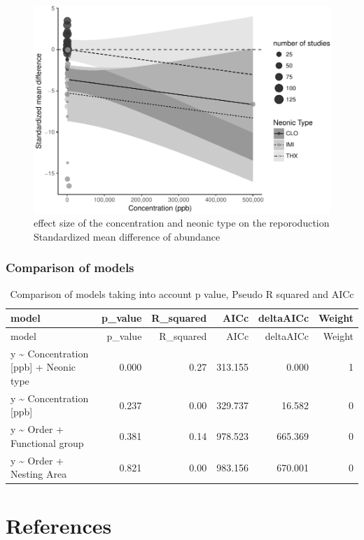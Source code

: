 \documentclass[]{elsarticle} %
\makeatletter
\def\maxwidth{\ifdim\Gin@nat@width>\linewidth\linewidth
\else\Gin@nat@width\fi}
\let\Oldincludegraphics\includegraphics
\renewcommand{\includegraphics}[1]{\Oldincludegraphics[width=\maxwidth]{#1}}
\makeatother
\begin{document}
\begin{figure}[htbp]
\centering
\includegraphics{MetanalysisNeonics2_files/figure-latex/unnamed-chunk-30-1.pdf}
\caption{effect size of the concentration and neonic type on the
reporoduction Standardized mean difference of abundance}
\end{figure}

\subsubsection{Comparison of models}\label{comparison-of-models-2}

\begin{longtable}[c]{@{}lrrrrr@{}}
\caption{Comparison of models taking into account p value, Pseudo R
squared and AICc}\tabularnewline
\toprule
model & p\_value & R\_squared & AICc & deltaAICc & Weight\tabularnewline
\midrule
\endfirsthead
\toprule
model & p\_value & R\_squared & AICc & deltaAICc & Weight\tabularnewline
\midrule
\endhead
y \textasciitilde{} Concentration {[}ppb{]} + Neonic type & 0.000 & 0.27
& 313.155 & 0.000 & 1\tabularnewline
y \textasciitilde{} Concentration {[}ppb{]} & 0.237 & 0.00 & 329.737 &
16.582 & 0\tabularnewline
y \textasciitilde{} Order + Functional group & 0.381 & 0.14 & 978.523 &
665.369 & 0\tabularnewline
y \textasciitilde{} Order + Nesting Area & 0.821 & 0.00 & 983.156 &
670.001 & 0\tabularnewline
\bottomrule
\end{longtable}

\section*{References}\label{references}
\end{document}
